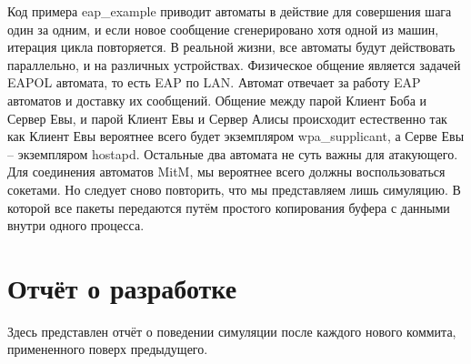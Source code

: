 \documentclass[oneside, final, 14pt]{extarticle}
\begin{document}
Код примера eap\_example приводит автоматы в действие для совершения шага
один за одним,
и если новое сообщение сгенерировано хотя одной из машин, итерация цикла повторяется.
В реальной жизни, все автоматы будут действовать параллельно,
и на различных устройствах.
Физическое общение является задачей EAPOL автомата,
то есть EAP по LAN.
Автомат отвечает за работу EAP автоматов и доставку
их сообщений.
Общение между парой Клиент Боба и Сервер Евы,
и парой Клиент Евы и Сервер Алисы происходит естественно
так как Клиент Евы вероятнее всего будет экземпляром wpa\_supplicant,
а Серве Евы  -- экземпляром hostapd.
Остальные два автомата не суть важны для атакующего.
Для соединения автоматов MitM, мы вероятнее всего должны воспользоваться
сокетами.
Но следует сново повторить, что мы представляем лишь симуляцию.
В которой все пакеты передаются путём простого копирования буфера с данными внутри
одного процесса.

\cleardoublepage

\section{Отчёт о разработке}

Здесь представлен отчёт о поведении симуляции
после каждого нового коммита, примененного
поверх предыдущего.
\end{document}
